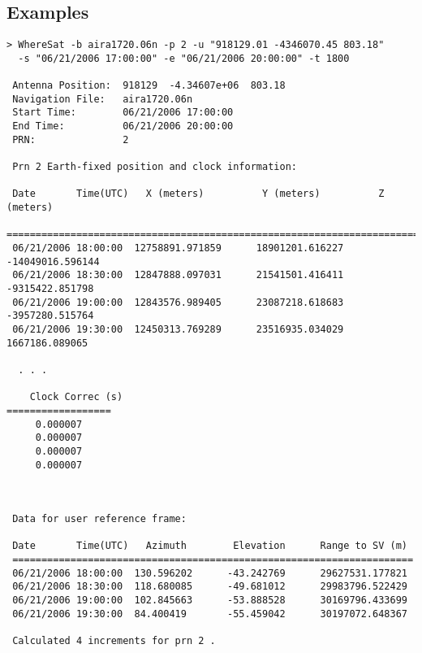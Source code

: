 \subsection{Examples}
\begin{\outputsize}
\begin{lstlisting}
> WhereSat -b aira1720.06n -p 2 -u "918129.01 -4346070.45 803.18"
  -s "06/21/2006 17:00:00" -e "06/21/2006 20:00:00" -t 1800

 Antenna Position:  918129  -4.34607e+06  803.18
 Navigation File:   aira1720.06n
 Start Time:        06/21/2006 17:00:00
 End Time:          06/21/2006 20:00:00
 PRN:               2

 Prn 2 Earth-fixed position and clock information:

 Date       Time(UTC)   X (meters)          Y (meters)          Z (meters)      
 ===============================================================================
 06/21/2006 18:00:00  12758891.971859      18901201.616227      -14049016.596144
 06/21/2006 18:30:00  12847888.097031      21541501.416411      -9315422.851798 
 06/21/2006 19:00:00  12843576.989405      23087218.618683      -3957280.515764 
 06/21/2006 19:30:00  12450313.769289      23516935.034029      1667186.089065  

  . . .

    Clock Correc (s)
==================
     0.000007
     0.000007
     0.000007
     0.000007

 

 Data for user reference frame:

 Date       Time(UTC)   Azimuth        Elevation      Range to SV (m)
 =====================================================================
 06/21/2006 18:00:00  130.596202      -43.242769      29627531.177821
 06/21/2006 18:30:00  118.680085      -49.681012      29983796.522429
 06/21/2006 19:00:00  102.845663      -53.888528      30169796.433699
 06/21/2006 19:30:00  84.400419       -55.459042      30197072.648367

 Calculated 4 increments for prn 2 .


\end{lstlisting}
\end{\outputsize}


%

